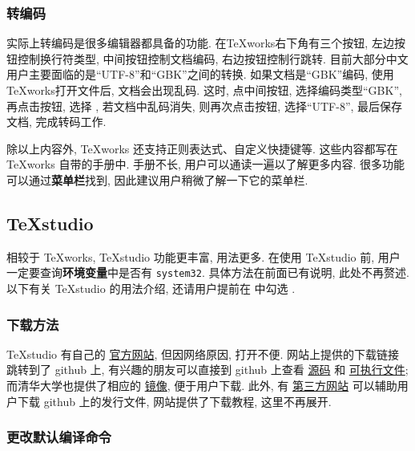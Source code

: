 \subsubsection{转编码}

实际上转编码是很多编辑器都具备的功能. 
在\TeX works右下角有三个按钮,
左边按钮控制换行符类型, 中间按钮控制文档编码, 右边按钮控制行跳转. 
目前大部分中文用户主要面临的是``UTF-8''和``GBK''之间的转换. 
如果文档是``GBK''编码, 使用\TeX works打开文件后, 文档会出现乱码. 
这时, 点中间按钮, 选择编码类型``GBK'', 再点击按钮,
选择 , 若文档中乱码消失, 则再次点击按钮,
选择``UTF-8'', 最后保存文档, 完成转码工作. 

除以上内容外, \TeX works 还支持正则表达式、自定义快捷键等. 
这些内容都写在 \TeX works 自带的手册中. 
手册不长, 用户可以通读一遍以了解更多内容.
很多功能可以通过\textbf{菜单栏}找到,
因此建议用户稍微了解一下它的菜单栏.

\subsection{\TeX studio}\label{subsec:texstudio}

相较于 \TeX works, \TeX studio 功能更丰富, 用法更多.
在使用 \TeX studio 前,
用户一定要查询\textbf{环境变量}中是否有 \texttt{system32}.
具体方法在前面已有说明, 此处不再赘述.
以下有关 \TeX studio 的用法介绍,
还请用户提前在  中勾选
.

\subsubsection{下载方法}

\TeX studio 有自己的%
\href{http://texstudio.sourceforge.net/}{官方网站},
但因网络原因,
打开不便.
网站上提供的下载链接跳转到了 github 上,
有兴趣的朋友可以直接到 github 上查看%
\href{https://github.com/texstudio-org/texstudio}{源码}%
和%
\href{https://github.com/texstudio-org/texstudio/releases}{可执行文件};
而清华大学也提供了相应的%
\href{https://mirrors.tuna.tsinghua.edu.cn/github-release/texstudio-org/texstudio/LatestRelease/}{镜像},
便于用户下载.
此外,
有%
\href{https://d.serctl.com}{第三方网站}%
可以辅助用户下载 github 上的发行文件,
网站提供了下载教程,
这里不再展开.

\subsubsection{更改默认编译命令}

